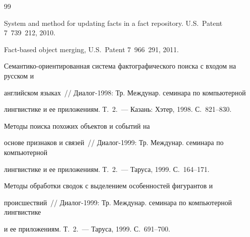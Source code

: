  {\small\frenchspacing


{%




\begin{thebibliography}{99}







     System and method for updating facts in a fact repository. U.S.\ Patent 7~739~212, 2010.







     Fact-based object merging, U.S.\ Patent 7~966~291, 2011.


    






     Семантико-ориентированная система фактографического поиска с входом на русском и 


английском языках~/\!\!/ Диалог-1998: Тр. Междунар. семинара по компьютерной 


лингвистике и ее приложениям. Т.~2.~--- Казань: Хэтер, 1998. С.~821--830.







      Методы поиска похожих объектов и событий на 


основе признаков и связей~/\!\!/ Диалог-1999: Тр. Междунар. семинара по компьютерной 


лингвистике и ее приложениям. Т.~2.~--- Таруса, 1999. С.~164--171. 









     Методы обработки сводок с выделением особенностей фигурантов и 


происшествий~/\!\!/ Диалог-1999: Тр. Междунар. семинара по компьютерной лингвистике 


и ее приложениям. Т.~2.~--- Таруса, 1999. С.~691--700.









\end{thebibliography}}}
